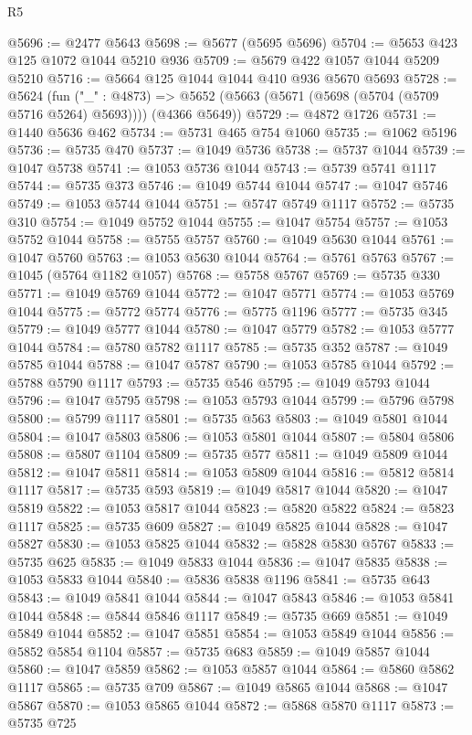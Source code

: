 \begin{lexlean}{R5}
\begin{coremodule}
@5696 := @2477 @5643
@5698 := @5677 (@5695 @5696)
@5704 := @5653 @423 @125 @1072 @1044 @5210 @936
@5709 := @5679 @422 @1057 @1044 @5209 @5210
@5716 := @5664 @125 @1044 @1044 @410 @936 @5670 @5693
@5728 := @5624
    (fun ("_" : @4873) =>
    @5652 (@5663 (@5671 (@5698 (@5704 (@5709 @5716 @5264) @5693)))) (@4366 @5649))
@5729 := @4872 @1726
@5731 := @1440 @5636 @462
@5734 := @5731 @465 @754 @1060
@5735 := @1062 @5196
@5736 := @5735 @470
@5737 := @1049 @5736
@5738 := @5737 @1044
@5739 := @1047 @5738
@5741 := @1053 @5736 @1044
@5743 := @5739 @5741 @1117
@5744 := @5735 @373
@5746 := @1049 @5744 @1044
@5747 := @1047 @5746
@5749 := @1053 @5744 @1044
@5751 := @5747 @5749 @1117
@5752 := @5735 @310
@5754 := @1049 @5752 @1044
@5755 := @1047 @5754
@5757 := @1053 @5752 @1044
@5758 := @5755 @5757
@5760 := @1049 @5630 @1044
@5761 := @1047 @5760
@5763 := @1053 @5630 @1044
@5764 := @5761 @5763
@5767 := @1045 (@5764 @1182 @1057)
@5768 := @5758 @5767
@5769 := @5735 @330
@5771 := @1049 @5769 @1044
@5772 := @1047 @5771
@5774 := @1053 @5769 @1044
@5775 := @5772 @5774
@5776 := @5775 @1196
@5777 := @5735 @345
@5779 := @1049 @5777 @1044
@5780 := @1047 @5779
@5782 := @1053 @5777 @1044
@5784 := @5780 @5782 @1117
@5785 := @5735 @352
@5787 := @1049 @5785 @1044
@5788 := @1047 @5787
@5790 := @1053 @5785 @1044
@5792 := @5788 @5790 @1117
@5793 := @5735 @546
@5795 := @1049 @5793 @1044
@5796 := @1047 @5795
@5798 := @1053 @5793 @1044
@5799 := @5796 @5798
@5800 := @5799 @1117
@5801 := @5735 @563
@5803 := @1049 @5801 @1044
@5804 := @1047 @5803
@5806 := @1053 @5801 @1044
@5807 := @5804 @5806
@5808 := @5807 @1104
@5809 := @5735 @577
@5811 := @1049 @5809 @1044
@5812 := @1047 @5811
@5814 := @1053 @5809 @1044
@5816 := @5812 @5814 @1117
@5817 := @5735 @593
@5819 := @1049 @5817 @1044
@5820 := @1047 @5819
@5822 := @1053 @5817 @1044
@5823 := @5820 @5822
@5824 := @5823 @1117
@5825 := @5735 @609
@5827 := @1049 @5825 @1044
@5828 := @1047 @5827
@5830 := @1053 @5825 @1044
@5832 := @5828 @5830 @5767
@5833 := @5735 @625
@5835 := @1049 @5833 @1044
@5836 := @1047 @5835
@5838 := @1053 @5833 @1044
@5840 := @5836 @5838 @1196
@5841 := @5735 @643
@5843 := @1049 @5841 @1044
@5844 := @1047 @5843
@5846 := @1053 @5841 @1044
@5848 := @5844 @5846 @1117
@5849 := @5735 @669
@5851 := @1049 @5849 @1044
@5852 := @1047 @5851
@5854 := @1053 @5849 @1044
@5856 := @5852 @5854 @1104
@5857 := @5735 @683
@5859 := @1049 @5857 @1044
@5860 := @1047 @5859
@5862 := @1053 @5857 @1044
@5864 := @5860 @5862 @1117
@5865 := @5735 @709
@5867 := @1049 @5865 @1044
@5868 := @1047 @5867
@5870 := @1053 @5865 @1044
@5872 := @5868 @5870 @1117
@5873 := @5735 @725

\end{coremodule}
\end{lexlean}
